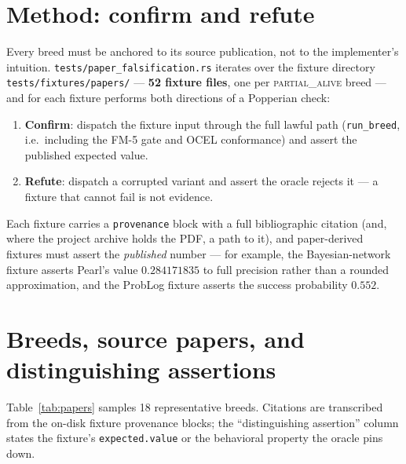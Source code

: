 \documentclass[11pt,oneside]{report}
\begin{document}
\section{Method: confirm and refute}

Every breed must be anchored to its source publication, not to the
implementer's intuition. \texttt{tests/paper\_falsification.rs} iterates
over the fixture directory \texttt{tests/fixtures/papers/} --- \textbf{52
fixture files}, one per \textsc{partial\_alive} breed --- and for each
fixture performs both directions of a Popperian check:

\begin{enumerate}
  \item \textbf{Confirm}: dispatch the fixture input through the full
  lawful path (\texttt{run\_breed}, i.e.\ including the FM-5 gate and OCEL
  conformance) and assert the published expected value.
  \item \textbf{Refute}: dispatch a corrupted variant and assert the
  oracle rejects it --- a fixture that cannot fail is not evidence.
\end{enumerate}

Each fixture carries a \texttt{provenance} block with a full bibliographic
citation (and, where the project archive holds the PDF, a path to it), and
paper-derived fixtures must assert the \emph{published} number --- for
example, the Bayesian-network fixture asserts Pearl's value
$0.284171835$ to full precision rather than a rounded approximation, and
the ProbLog fixture asserts the success probability $0.552$.

\section{Breeds, source papers, and distinguishing assertions}

Table~\ref{tab:papers} samples 18 representative breeds. Citations are
transcribed from the on-disk fixture provenance blocks; the
``distinguishing assertion'' column states the fixture's
\texttt{expected.value} or the behavioral property the oracle pins down.
\end{document}
